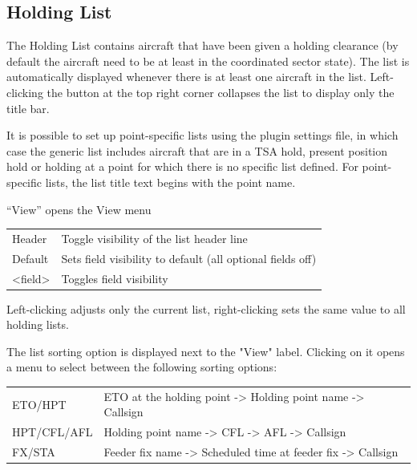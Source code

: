 \documentclass[a4paper,oneside,11pt]{memoir}
\begin{document}

\subsection{Holding List}\label{list:hold}


The Holding List contains aircraft that have been given a holding clearance (by default the aircraft need to be at least in the coordinated sector state). The list is automatically displayed whenever there is at least one aircraft in the list. Left-clicking the button at the top right corner collapses the list to display only the title bar.

\bigskip

It is possible to set up point-specific lists using the plugin settings file, in which case the generic list includes aircraft that are in a TSA hold, present position hold or holding at a point for which there is no specific list defined. For point-specific lists, the list title text begins with the point name.

\bigskip

“View” opens the View menu

\begin{longtable}{p{5cm} p{7.5cm}}
  Header  & Toggle visibility of the list header line\\
  Default & Sets field visibility to default (all optional fields off)\\
  <field> & Toggles field visibility\\
\end{longtable}

Left-clicking adjusts only the current list, right-clicking sets the same value to all holding lists.

\bigskip

The list sorting option is displayed next to the "View" label. Clicking on it opens a menu to select between the following sorting options:

\bigskip

\begin{longtable}{p{5cm} p{7.5cm}}
  ETO/HPT     & ETO at the holding point -> Holding point name -> Callsign\\
  HPT/CFL/AFL & Holding point name -> CFL -> AFL -> Callsign\\
  FX/STA      & Feeder fix name -> Scheduled time at feeder fix -> Callsign\\
\end{longtable}
\end{document}
